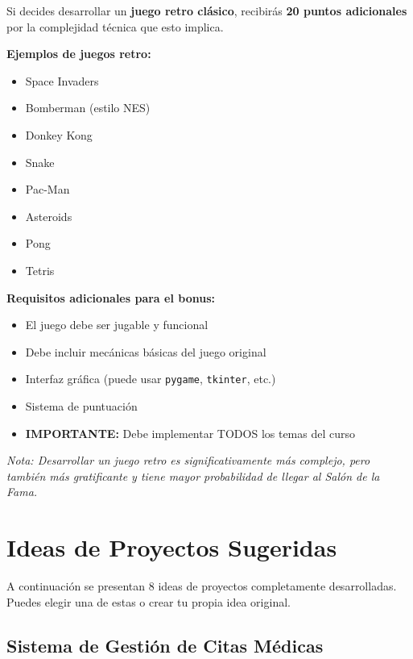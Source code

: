 \documentclass[12pt,a4paper]{article}
\begin{document}
\begin{tcolorbox}[colback=naorange!5!white,colframe=naorange,title=\textbf{Desafío Especial: Juegos Retro}]
Si decides desarrollar un \textbf{juego retro clásico}, recibirás \textbf{20 puntos adicionales} por la complejidad técnica que esto implica.

\vspace{0.5em}
\textbf{Ejemplos de juegos retro:}
\begin{itemize}
    \item Space Invaders
    \item Bomberman (estilo NES)
    \item Donkey Kong
    \item Snake
    \item Pac-Man
    \item Asteroids
    \item Pong
    \item Tetris
\end{itemize}

\vspace{0.5em}
\textbf{Requisitos adicionales para el bonus:}
\begin{itemize}
    \item El juego debe ser jugable y funcional
    \item Debe incluir mecánicas básicas del juego original
    \item Interfaz gráfica (puede usar \texttt{pygame}, \texttt{tkinter}, etc.)
    \item Sistema de puntuación
    \item \textbf{IMPORTANTE:} Debe implementar TODOS los temas del curso
\end{itemize}

\vspace{0.5em}
\textit{Nota: Desarrollar un juego retro es significativamente más complejo, pero también más gratificante y tiene mayor probabilidad de llegar al Salón de la Fama.}
\end{tcolorbox}

\section{Ideas de Proyectos Sugeridas}

A continuación se presentan 8 ideas de proyectos completamente desarrolladas. Puedes elegir una de estas o crear tu propia idea original.

\subsection{Sistema de Gestión de Citas Médicas}
\end{document}
